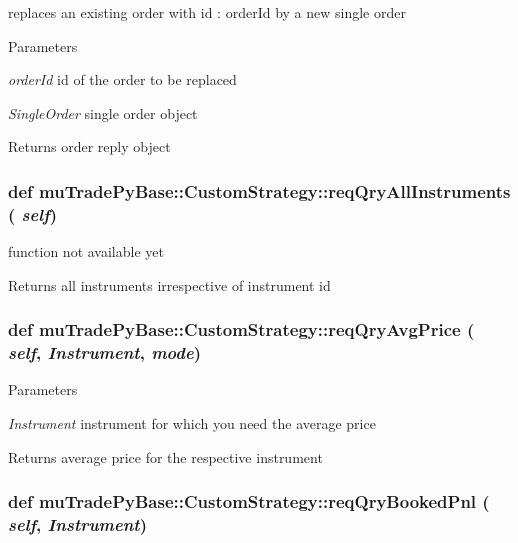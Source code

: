 replaces an existing order with id : orderId by a new single order 
\begin{DoxyParams}{Parameters}
\item[{\em orderId}]id of the order to be replaced \item[{\em SingleOrder}]single order object \end{DoxyParams}
\begin{DoxyReturn}{Returns}
order reply object 
\end{DoxyReturn}
\hypertarget{classmuTradePyBase_1_1CustomStrategy_a4f86b387e2a4566bc34e49a6eed18683}{
\subsubsection[{reqQryAllInstruments}]{\setlength{\rightskip}{0pt plus 5cm}def muTradePyBase::CustomStrategy::reqQryAllInstruments ( {\em self})}}
\label{classmuTradePyBase_1_1CustomStrategy_a4f86b387e2a4566bc34e49a6eed18683}


function not available yet \begin{DoxyReturn}{Returns}
all instruments irrespective of instrument id 
\end{DoxyReturn}
\hypertarget{classmuTradePyBase_1_1CustomStrategy_a831e1208c1c70bd5a6d461156aa9a77a}{
\subsubsection[{reqQryAvgPrice}]{\setlength{\rightskip}{0pt plus 5cm}def muTradePyBase::CustomStrategy::reqQryAvgPrice ( {\em self}, \/   {\em Instrument}, \/   {\em mode})}}
\label{classmuTradePyBase_1_1CustomStrategy_a831e1208c1c70bd5a6d461156aa9a77a}

\begin{DoxyParams}{Parameters}
\item[{\em Instrument}]instrument for which you need the average price \end{DoxyParams}
\begin{DoxyReturn}{Returns}
average price for the respective instrument 
\end{DoxyReturn}
\hypertarget{classmuTradePyBase_1_1CustomStrategy_a833fe1cfaf064a995fd4caa2cdc32683}{
\subsubsection[{reqQryBookedPnl}]{\setlength{\rightskip}{0pt plus 5cm}def muTradePyBase::CustomStrategy::reqQryBookedPnl ( {\em self}, \/   {\em Instrument})}}
\label{classmuTradePyBase_1_1CustomStrategy_a833fe1cfaf064a995fd4caa2cdc32683}

